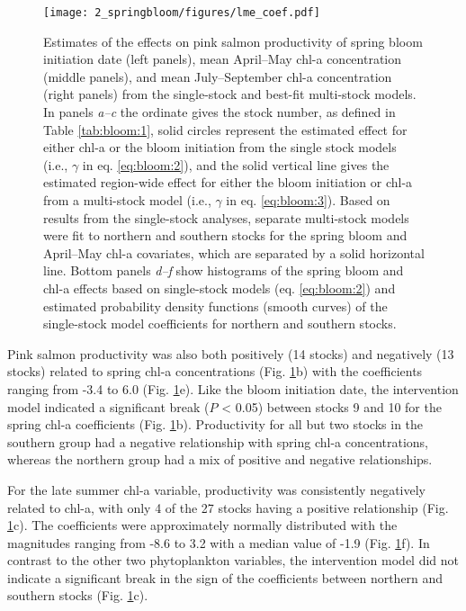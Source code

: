 \begin{figure}[htbp]
  \centering \texttt{[image: 2\_springbloom/figures/lme\_coef.pdf]}
  \caption[Estimates of the effects on salmon productivity of spring
           bloom initiation date and chl-a concentrations]{Estimates of the
           effects on pink salmon productivity of spring bloom initiation date
           (left panels), mean April--May chl-a concentration (middle panels),
           and mean July--September chl-a concentration (right panels) from the
           single-stock and best-fit multi-stock models. In panels \emph{a--c}
           the ordinate gives the stock number, as defined in Table
           \ref{tab:bloom:1}, solid circles represent the estimated effect for
           either chl-a or the bloom initiation from the single stock models
           (i.e., \(\gamma\) in eq.  \ref{eq:bloom:2}), and the solid vertical
           line gives the estimated region-wide effect for either the bloom
           initiation or chl-a from a multi-stock model (i.e., \(\gamma\) in eq.
           \ref{eq:bloom:3}). Based on results from the single-stock analyses,
           separate multi-stock models were fit to northern and southern stocks
           for the spring bloom and April--May chl-a covariates, which are
           separated by a solid horizontal line. Bottom panels \emph{d--f} show
           histograms of the spring bloom and chl-a effects based on
           single-stock models (eq. \ref{eq:bloom:2}) and estimated probability
           density functions (smooth curves) of the single-stock model
           coefficients for northern and southern stocks.}
  \label{fig:bloom:6}
\end{figure}

Pink salmon productivity was also both positively (14 stocks) and negatively (13
stocks) related to spring chl-a concentrations (Fig. \ref{fig:bloom:6}b) with
the coefficients ranging from -3.4 to 6.0 (Fig. \ref{fig:bloom:6}e). Like the
bloom initiation date, the intervention model indicated a significant break ($P$
\textless{} 0.05) between stocks 9 and 10 for the spring chl-a coefficients
(Fig. \ref{fig:bloom:6}b). Productivity for all but two stocks in the southern
group had a negative relationship with spring chl-a concentrations, whereas the
northern group had a mix of positive and negative relationships.

For the late summer chl-a variable, productivity was consistently negatively
related to chl-a, with only 4 of the 27 stocks having a positive relationship
(Fig. \ref{fig:bloom:6}c). The coefficients were approximately normally
distributed with the magnitudes ranging from -8.6 to 3.2 with a median value of
-1.9 (Fig.  \ref{fig:bloom:6}f). In contrast to the other two phytoplankton
variables, the intervention model did not indicate a significant break in the
sign of the coefficients between northern and southern stocks (Fig.
\ref{fig:bloom:6}c).


